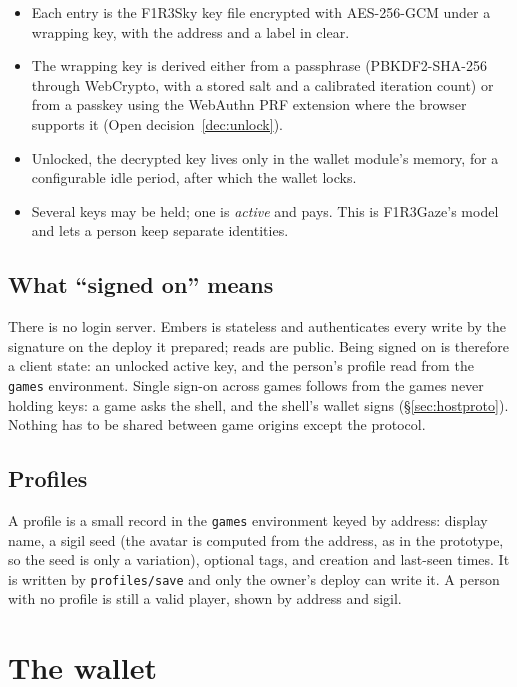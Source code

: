 \documentclass[11pt]{article}
\theoremstyle{definition}
\theoremstyle{remark}
\newcommand{\code}[1]{\texttt{#1}}
\newcommand{\Em}{Embers}
\newcommand{\Sky}{F1R3Sky}
\newcommand{\Gz}{F1R3Gaze}
\begin{document}
\begin{itemize}[leftmargin=*,itemsep=2pt]
\item Each entry is the \Sky{} key file encrypted with AES-256-GCM under a wrapping
  key, with the address and a label in clear.
\item The wrapping key is derived either from a passphrase (PBKDF2-SHA-256 through
  WebCrypto, with a stored salt and a calibrated iteration count) or from a passkey
  using the WebAuthn PRF extension where the browser supports it (Open
  decision~\ref{dec:unlock}).
\item Unlocked, the decrypted key lives only in the wallet module's memory, for a
  configurable idle period, after which the wallet locks.
\item Several keys may be held; one is \emph{active} and pays. This is \Gz{}'s model
  and lets a person keep separate identities.
\end{itemize}

\subsection{What ``signed on'' means}

There is no login server. \Em{} is stateless and authenticates every write by the
signature on the deploy it prepared; reads are public. Being signed on is therefore
a client state: an unlocked active key, and the person's profile read from the
\code{games} environment. Single sign-on across games follows from the games never
holding keys: a game asks the shell, and the shell's wallet signs
(\S\ref{sec:hostproto}). Nothing has to be shared between game origins except the
protocol.

\subsection{Profiles}

A profile is a small record in the \code{games} environment keyed by address:
display name, a sigil seed (the avatar is computed from the address, as in the
prototype, so the seed is only a variation), optional tags, and creation and
last-seen times. It is written by \code{profiles/save} and only the owner's deploy
can write it. A person with no profile is still a valid player, shown by address and
sigil.

\section{The wallet}\label{sec:wallet}
\end{document}

